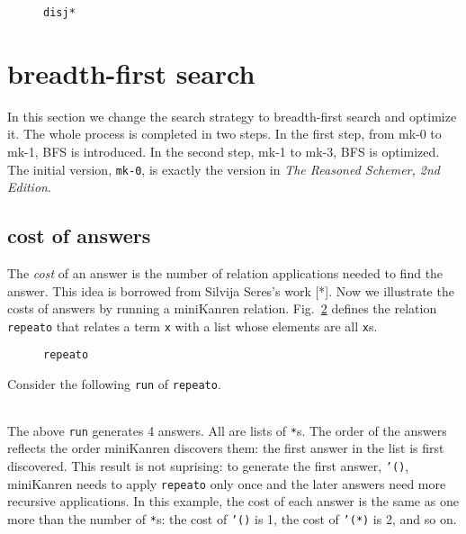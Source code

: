 \documentclass[format=acmlarge, review=true, authordraft=true]{acmart}
\begin{document}
\begin{figure}
  
  \caption{\texttt{disj*}}
  \label{disj*}
\end{figure}

\section{breadth-first search}

In this section we change the search strategy to breadth-first search and 
optimize it. The whole process is completed in two steps. In the first step, 
from mk-0 to mk-1, BFS is introduced. In the second step, mk-1 to mk-3, BFS is 
optimized. The initial version, \texttt{mk-0}, is exactly the version in 
\emph{The Reasoned Schemer, 2nd Edition}.

\subsection{cost of answers}


The \emph{cost} of an answer is the number of relation applications needed to
find the answer. This idea is borrowed from Silvija Seres's work [*].
Now we illustrate the costs of answers by running a miniKanren relation.
Fig.~\ref{def-repeato} defines the relation \texttt{repeato} that 
relates a term \texttt{x} with a list whose elements are all \texttt{x}s.

\begin{figure}
  
  \caption{\texttt{repeato}}
  \label{def-repeato}
\end{figure}

Consider the following \texttt{run} of \texttt{repeato}.
\begin{center}
  \begin{tabular}{c}
  
   \end{tabular}
\end{center}

The above \texttt{run} generates 4 answers. All are lists of \texttt{*}s.
The order of the answers reflects the order miniKanren discovers them:
the first answer in the list is first discovered. This result is not suprising:
to generate the first answer, \texttt{'()}, miniKanren needs to apply
\texttt{repeato} only once and the later answers need more recursive
applications. In this example, the cost of each answer is the same as
one more than the number of \texttt{*}s: the cost of \texttt{'()} is 1,
the cost of \texttt{'(*)} is 2, and so on.
\end{document}

